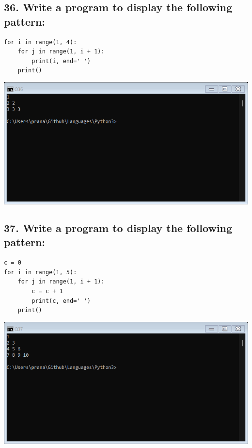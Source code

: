 \documentclass[12pt]{article}
\begin{document}
\subsection*{36. Write a program to display the following pattern:}
\begin{verbatim}
for i in range(1, 4):
    for j in range(1, i + 1):
        print(i, end=' ')
    print()
\end{verbatim}
\includegraphics[width=\linewidth]{images/36.png}

\subsection*{37. Write a program to display the following pattern:}
\begin{verbatim}
c = 0
for i in range(1, 5):
    for j in range(1, i + 1):
        c = c + 1
        print(c, end=' ')
    print()
\end{verbatim}
\includegraphics[width=\linewidth]{images/37.png}
\end{document}
